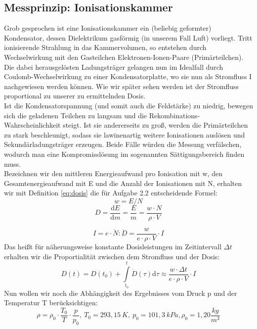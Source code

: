 \subsection{Messprinzip: Ionisationskammer}
Grob gesprochen ist eine Ionisationskammer ein (beliebig geformter) Kondensator, dessen Dielektrikum gasförmig (in unserem Fall Luft) vorliegt. Tritt ionisierende Strahlung in das Kammervolumen, so entstehen durch Wechselwirkung mit den Gasteilchen Elektronen-Ionen-Paare (Primärteilchen). Die dabei herausgelösten Ladungsträger gelangen nun im Idealfall durch Coulomb-Wechselwirkung zu einer Kondensatorplatte, wo sie nun als Stromfluss I nachgewiesen werden können. Wie wir später sehen werden ist der Stromfluss proportional zu unserer zu ermittelnden Dosis.\\ 
Ist die Kondensatorspannung (und somit auch die Feldstärke) zu niedrig, bewegen sich die geladenen Teilchen zu langsam und die Rekombinations-Wahrscheinlichkeit steigt. Ist sie andererseits zu groß, werden die Primärteilchen zu stark beschleunigt, sodass sie lawinenartig weitere Ionisationen auslösen und Sekundärladungsträger erzeugen. Beide Fälle würden die Messung verfälschen, wodurch man eine Kompromisslösung im sogenannten Sättigungsbereich finden muss.\\
Bezeichnen wir den mittleren Energieaufwand pro Ionisation mit w, den Gesamtenergieaufwand mit E und die Anzahl der Ionisationen mit N, erhalten wir mit Definition \eqref{eq:dosis} die für Aufgabe 2.2 entscheidende Formel:
\begin{equation}
	w = E / N
\end{equation}
\begin{equation}
	D = \frac{\textrm{d}E}{\textrm{d}m}=\frac{E}{m}=\frac{w \cdot N}{\rho \cdot V}
\end{equation}

\begin{equation}
	I = e \cdot \dot{N}: \dot{D} = \frac{w}{e \cdot \rho \cdot V} \cdot I
\end{equation}
Das heißt für näherungsweise konstante Dosisleistungen im Zeitintervall $\Delta t$ erhalten wir die Proportialität zwischen dem Stromfluss und der Dosis:
\begin{equation}
	D(t) = D(t_0) + \int \limits_{t_0}^{t} \dot{D}(\tau) \mathrm{d}\tau \approx \frac{w \cdot \Delta t}{e \cdot \rho \cdot V} \cdot I
\end{equation}
Nun wollen wir noch die Abhängigkeit des Ergebnisses vom Druck p und der Temperatur T berücksichtigen:
\begin{equation}
	\rho = \rho_0 \cdot \frac{T_0}{T} \cdot \frac{p}{p_0} ,
	\ T_0 = 293,15\ K,\ p_0 = 101,3\ kPa, \rho_0 =1,20 \frac{kg}{m^3}
    \label{formel:kappa}
\end{equation}


